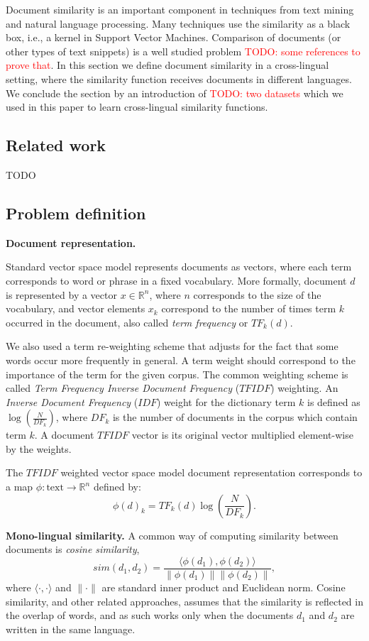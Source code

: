 \documentclass[twoside,11pt]{article}
\newcommand{\todo}[1]{\textcolor{red}{TODO: #1}}
\newcommand{\RR}{\mathbb{R}}
\begin{document}
Document similarity is an important component in techniques from text mining and natural language processing. Many techniques use the similarity as a black box, i.e., a kernel in Support Vector Machines. Comparison of documents (or other types of text snippets) is a well studied problem \todo{some references to prove that}. In this section we define document similarity in a cross-lingual setting, where the similarity function receives documents in different languages. We conclude the section by an introduction of \todo{two datasets} which we used in this paper to learn cross-lingual similarity functions.

\subsection{Related work}

TODO

\subsection{Problem definition}

\textbf{Document representation.}

Standard vector space model \cite{xxx} represents documents as vectors, where each term corresponds to word or phrase in a fixed vocabulary. More formally, document $d$ is represented by a vector $x \in \RR^n$, where $n$ corresponds to the size of the vocabulary, and vector elements $x_k$ correspond to the number of times term $k$ occurred in the document, also called \emph{term frequency} or $TF_k(d)$.

We also used a term re-weighting scheme that adjusts for the fact that some words occur more frequently in general. A term weight should correspond to the importance of the term for the given corpus. The common weighting scheme is called \emph{Term Frequency Inverse Document Frequency} ($TFIDF$) weighting. An \emph{Inverse Document Frequency} ($IDF$) weight for the dictionary term $k$ is defined as $\log( \frac{N}{DF_k} )$, where $DF_k$ is the number of documents in the corpus which contain term $k$.  A document $TFIDF$ vector is its original vector multiplied element-wise by the weights.

The $TFIDF$ weighted vector space model document representation corresponds to a map $\phi : \text{text} \rightarrow \RR^n$ defined by:
$$\phi(d)_k = {TF}_k(d) \log( \frac{N}{{DF}_k}).$$

\textbf {Mono-lingual similarity.}
A common way of computing similarity between documents is \emph{cosine similarity},
$$sim(d_1, d_2) = \frac{\langle \phi(d_1), \phi(d_2)\rangle}{\|\phi(d_1)\| \|\phi(d_2)\|},$$
where $\langle \cdot,\cdot \rangle$ and $\|\cdot\|$ are standard inner product and Euclidean norm. Cosine similarity, and other related approaches, assumes that the similarity is reflected in the overlap of words, and as such works only when the documents $d_1$ and $d_2$ are written in the same language.
\end{document}
